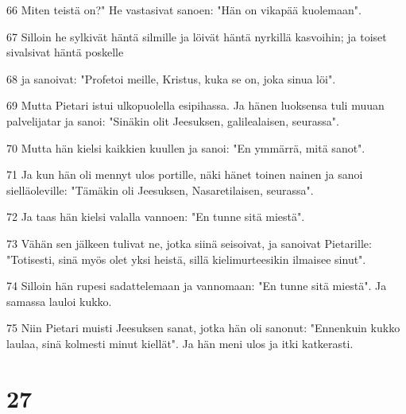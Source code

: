 \par 66 Miten teistä on?" He vastasivat sanoen: "Hän on vikapää kuolemaan".
\par 67 Silloin he sylkivät häntä silmille ja löivät häntä nyrkillä kasvoihin; ja toiset sivalsivat häntä poskelle
\par 68 ja sanoivat: "Profetoi meille, Kristus, kuka se on, joka sinua löi".
\par 69 Mutta Pietari istui ulkopuolella esipihassa. Ja hänen luoksensa tuli muuan palvelijatar ja sanoi: "Sinäkin olit Jeesuksen, galilealaisen, seurassa".
\par 70 Mutta hän kielsi kaikkien kuullen ja sanoi: "En ymmärrä, mitä sanot".
\par 71 Ja kun hän oli mennyt ulos portille, näki hänet toinen nainen ja sanoi sielläoleville: "Tämäkin oli Jeesuksen, Nasaretilaisen, seurassa".
\par 72 Ja taas hän kielsi valalla vannoen: "En tunne sitä miestä".
\par 73 Vähän sen jälkeen tulivat ne, jotka siinä seisoivat, ja sanoivat Pietarille: "Totisesti, sinä myös olet yksi heistä, sillä kielimurteesikin ilmaisee sinut".
\par 74 Silloin hän rupesi sadattelemaan ja vannomaan: "En tunne sitä miestä". Ja samassa lauloi kukko.
\par 75 Niin Pietari muisti Jeesuksen sanat, jotka hän oli sanonut: "Ennenkuin kukko laulaa, sinä kolmesti minut kiellät". Ja hän meni ulos ja itki katkerasti.

\chapter{27}

